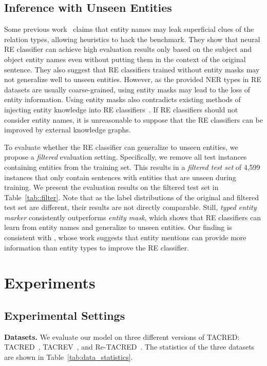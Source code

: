 \documentclass[11pt,a4paper]{article}
\begin{document}
\subsection{Inference with Unseen Entities}
\label{sec:unseen_entities}
Some previous work~\cite{zhang-etal-2018-graph} claims that entity names may leak superficial clues of the relation types, allowing heuristics to hack the benchmark.
They show that neural RE classifier can achieve high evaluation results only based on the subject and object entity names even without putting them in the context of the original sentence.
They also suggest that RE classifiers trained without entity masks may not generalize well to unseen entities.
However, as the provided NER types in RE datasets are usually coarse-grained, using entity masks may lead to the loss of entity information.
Using entity masks also contradicts existing methods of injecting entity knowledge into RE classifiers~\cite{zhang-etal-2019-ernie,peters-etal-2019-knowledge,wang2020k}.
If RE classifiers should not consider entity names, it is unreasonable to suppose that the RE classifiers can be improved by external knowledge graphs.

To evaluate whether the RE classifier can generalize to unseen entities, we propose a \textit{filtered} evaluation setting.
Specifically, we remove all test instances containing entities from the training set. This results in a \textit{filtered test set} of 4,599 instances that only contain sentences with entities that are unseen during training.
We present the evaluation results on the filtered test set in Table~\ref{tab::filter}.
Note that as the label distributions of the original and filtered test set are different, their results are not directly comparable.
Still, \emph{typed entity marker} consistently outperforms \emph{entity mask}, which shows that RE classifiers can learn from entity names and generalize to unseen entities.
Our finding is consistent with \citet{peng-etal-2020-learning}, whose work suggests that entity mentions can provide more information than entity types to improve the RE classifier.




\section{Experiments}
\subsection{Experimental Settings}
\smallskip
\noindent
\textbf{Datasets.} We evaluate our model on three different versions of TACRED: TACRED~\cite{zhang-etal-2017-position}, TACREV~\cite{alt-etal-2020-tacred}, and Re-TACRED~\cite{stoica2021re}.
The statistics of the three datasets are shown in Table~\ref{tab:data_statistics}.
\end{document}
